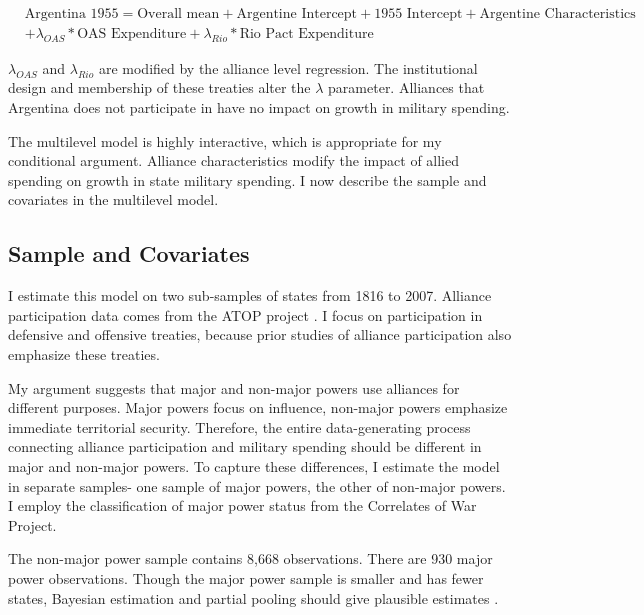 \documentclass[12pt]{article}
\begin{document}
\begin{equation}
\begin{split}
& \mbox{Argentina 1955} = \mbox{Overall mean}
+ \mbox{Argentine Intercept} + \mbox{1955 Intercept} 
+ \mbox{Argentine Characteristics} \\
& + \lambda_{OAS} * \mbox{OAS Expenditure} + \lambda_{Rio} * \mbox{Rio Pact Expenditure}
\end{split} 
\end{equation}


$\lambda_{OAS}$ and $\lambda_{Rio}$ are modified by the alliance level regression. 
The institutional design and membership of these treaties alter the $\lambda$ parameter.
Alliances that Argentina does not participate in have no impact on growth in military spending. 


The multilevel model is highly interactive, which is appropriate for my conditional argument. 
Alliance characteristics modify the impact of allied spending on growth in state military spending. 
I now describe the sample and covariates in the multilevel model.  



\subsection{Sample and Covariates} 

I estimate this model on two sub-samples of states from 1816 to 2007. 
Alliance participation data comes from the ATOP project \citep{Leedsetal2002}. 
I focus on participation in defensive and offensive treaties, because prior studies of alliance participation also emphasize these treaties. 


My argument suggests that major and non-major powers use alliances for different purposes.
Major powers focus on influence, non-major powers emphasize immediate territorial security.  
Therefore, the entire data-generating process connecting alliance participation and military spending should be different in major and non-major powers. 
To capture these differences, I estimate the model in separate samples- one sample of major powers, the other of non-major powers.
I employ the classification of major power status from the Correlates of War Project. 


The non-major power sample contains 8,668 observations. 
There are 930 major power observations. 
Though the major power sample is smaller and has fewer states, Bayesian estimation and partial pooling should give plausible estimates \citep{Stegmueller2013}. 
\end{document}

